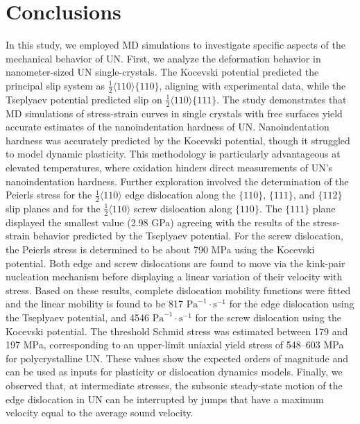 \documentclass[applsci,article,submit,pdftex,moreauthors]{Definitions/mdpi}
\newcommand{\?}{\stackrel{?}{=}}
\begin{document}
\section{Conclusions}

In this study, we employed MD simulations to investigate specific aspects of the mechanical behavior of UN. First, we analyze the deformation behavior in nanometer-sized UN single-crystals. The Kocevski potential predicted the principal slip system as $\frac{1}{2} \langle 110 \rangle \{110\}$, aligning with experimental data, while the Tseplyaev potential predicted slip on $\frac{1}{2} \langle 110 \rangle \{111\}$. The study demonstrates that MD simulations of stress-strain curves in single crystals with free surfaces yield accurate estimates of the nanoindentation hardness of UN. Nanoindentation hardness was accurately predicted by the Kocevski potential, though it struggled to model dynamic plasticity. This methodology is particularly advantageous at elevated temperatures, where oxidation hinders direct measurements of UN's nanoindentation hardness. Further exploration involved the determination of the Peierls stress for the $\frac{1}{2} \langle 110 \rangle$ edge dislocation along the $\{ 110 \}$, $\{ 111 \}$, and $\{ 112 \}$ slip planes and for the $\frac{1}{2} \langle 110 \rangle$ screw dislocation along $\{110\}$. The $\{ 111 \}$ plane displayed the smallest value (2.98 GPa) agreeing with the results of the stress-strain behavior predicted by the Tseplyaev potential. For the screw dislocation, the Peierls stress is determined to be about 790 MPa using the Kocevski potential. Both edge and screw dislocations are found to move via the kink-pair nucleation mechanism before displaying a linear variation of their velocity with stress. Based on these results, complete dislocation mobility functions were fitted and the linear mobility is found to be 817 $\mathrm{Pa}^{-1} \! \cdot \! \mathrm{s}^{-1}$ for the edge dislocation using the Tseplyaev potential, and 4546 $\mathrm{Pa}^{-1} \! \cdot \! \mathrm{s}^{-1}$ for the screw dislocation using the Kocevski potential. The threshold Schmid stress was estimated between 179 and 197 MPa, corresponding to an upper-limit uniaxial yield stress of 548–603 MPa for polycrystalline UN. These values show the expected orders of magnitude and can be used as inputs for plasticity or dislocation dynamics models. Finally, we observed that, at intermediate stresses, the subsonic steady-state motion of the edge dislocation in UN can be interrupted by jumps that have a maximum velocity equal to the average sound velocity.
\end{document}
